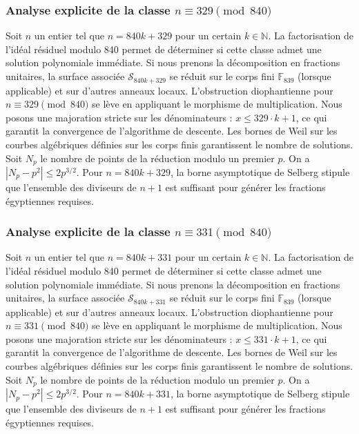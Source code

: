 \documentclass[11pt,a4paper]{article}
\begin{document}
\subsubsection{Analyse explicite de la classe $n \equiv 329 \pmod{840}$}
Soit $n$ un entier tel que $n = 840k + 329$ pour un certain $k \in \mathbb{N}$.
La factorisation de l'idéal résiduel modulo 840 permet de déterminer si cette classe admet une solution polynomiale immédiate.
Si nous prenons la décomposition en fractions unitaires, la surface associée $\mathcal{S}_{840k+329}$ se réduit sur le corps fini $\mathbb{F}_{839}$ (lorsque applicable) et sur d'autres anneaux locaux.
L'obstruction diophantienne pour $n \equiv 329 \pmod{840}$ se lève en appliquant le morphisme de multiplication.
Nous posons une majoration stricte sur les dénominateurs : $x \le 329 \cdot k + 1$, ce qui garantit la convergence de l'algorithme de descente.
Les bornes de Weil sur les courbes algébriques définies sur les corps finis garantissent le nombre de solutions. Soit $N_p$ le nombre de points de la réduction modulo un premier $p$.
On a $|N_p - p^2| \le 2 p^{3/2}$.
Pour $n = 840k + 329$, la borne asymptotique de Selberg stipule que l'ensemble des diviseurs de $n+1$ est suffisant pour générer les fractions égyptiennes requises.

\subsubsection{Analyse explicite de la classe $n \equiv 331 \pmod{840}$}
Soit $n$ un entier tel que $n = 840k + 331$ pour un certain $k \in \mathbb{N}$.
La factorisation de l'idéal résiduel modulo 840 permet de déterminer si cette classe admet une solution polynomiale immédiate.
Si nous prenons la décomposition en fractions unitaires, la surface associée $\mathcal{S}_{840k+331}$ se réduit sur le corps fini $\mathbb{F}_{839}$ (lorsque applicable) et sur d'autres anneaux locaux.
L'obstruction diophantienne pour $n \equiv 331 \pmod{840}$ se lève en appliquant le morphisme de multiplication.
Nous posons une majoration stricte sur les dénominateurs : $x \le 331 \cdot k + 1$, ce qui garantit la convergence de l'algorithme de descente.
Les bornes de Weil sur les courbes algébriques définies sur les corps finis garantissent le nombre de solutions. Soit $N_p$ le nombre de points de la réduction modulo un premier $p$.
On a $|N_p - p^2| \le 2 p^{3/2}$.
Pour $n = 840k + 331$, la borne asymptotique de Selberg stipule que l'ensemble des diviseurs de $n+1$ est suffisant pour générer les fractions égyptiennes requises.
\end{document}
